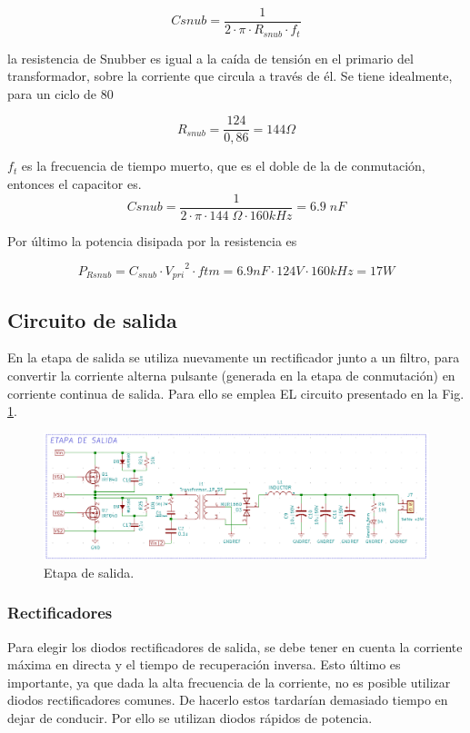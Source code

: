 \documentclass[11pt, a4paper]{article}
\begin{document}
\begin{equation}
Csnub = \frac{1}{2 \cdot \pi \cdot R_{snub} \cdot f_t}
\end{equation}

la resistencia de Snubber es igual a la caída de tensión en el primario del transformador, sobre la
corriente que circula a través de él. Se tiene idealmente, para un ciclo de 80 %

\begin{equation}
R_{snub} = \frac{124}{0,86} = 144 \Omega
\end{equation}

$f_t$ es la frecuencia de tiempo muerto, que es el doble de la de conmutación, entonces el capacitor
es.
\begin{equation}
Csnub = \frac{1}{2 \cdot \pi \cdot 144 \; \Omega \cdot 160 kHz} = 6.9 \; nF
\end{equation}

Por último la potencia disipada por la resistencia es

\begin{equation}
P_{Rsnub}  = C_{snub} \cdot {V_{pri}}^2  \cdot ftm = 6.9 nF \cdot 124 V \cdot 160 kHz = 17 W
\end{equation}


\subsection{Circuito de salida}
En la etapa de salida se utiliza nuevamente un rectificador junto a un
filtro, para convertir la corriente alterna pulsante (generada en la etapa de conmutación) en corriente continua de salida. Para ello se emplea EL circuito presentado en la Fig. \ref{salida}.

\begin{figure}[h]
	\centering
	\includegraphics[width = \textwidth]{Imagenes/trafo_salida}
	\caption{Etapa de salida.}
	\label{salida}
\end{figure}

\subsubsection{Rectificadores}
Para elegir los diodos rectificadores de salida, se debe tener en cuenta la corriente máxima en directa y el tiempo de recuperación inversa. Esto último es importante, ya que dada la alta frecuencia de la corriente, no es posible utilizar diodos rectificadores comunes. De hacerlo estos tardarían demasiado tiempo en dejar de conducir. Por ello se utilizan diodos rápidos de potencia.
\end{document}
